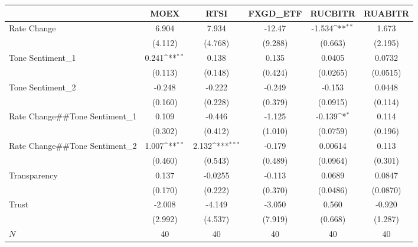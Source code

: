 {
\def\sym#1{\ifmmode^{#1}\else\(^{#1}\)\fi}
\begin{tabular}{l*{5}{c}}
\hline\hline
            &\multicolumn{1}{c}{MOEX}&\multicolumn{1}{c}{RTSI}&\multicolumn{1}{c}{FXGD\_ETF}&\multicolumn{1}{c}{RUCBITR}&\multicolumn{1}{c}{RUABITR}\\
\hline
Rate Change &       6.904         &       7.934         &      -12.47         &      -1.534\sym{**} &       1.673         \\
            &     (4.112)         &     (4.768)         &     (9.288)         &     (0.663)         &     (2.195)         \\
[1em]
Tone Sentiment\_{1}&       0.241\sym{**} &       0.138         &       0.135         &      0.0405         &      0.0732         \\
            &     (0.113)         &     (0.148)         &     (0.424)         &    (0.0265)         &    (0.0515)         \\
[1em]
Tone Sentiment\_{2}&      -0.248         &      -0.222         &      -0.249         &      -0.153         &      0.0448         \\
            &     (0.160)         &     (0.228)         &     (0.379)         &    (0.0915)         &     (0.114)         \\
[1em]
Rate Change##Tone Sentiment\_{1}&       0.109         &      -0.446         &      -1.125         &      -0.139\sym{*}  &       0.114         \\
            &     (0.302)         &     (0.412)         &     (1.010)         &    (0.0759)         &     (0.196)         \\
[1em]
Rate Change##Tone Sentiment\_{2}&       1.007\sym{**} &       2.132\sym{***}&      -0.179         &     0.00614         &       0.113         \\
            &     (0.460)         &     (0.543)         &     (0.489)         &    (0.0964)         &     (0.301)         \\
[1em]
Transparency&       0.137         &     -0.0255         &      -0.113         &      0.0689         &      0.0847         \\
            &     (0.170)         &     (0.222)         &     (0.370)         &    (0.0486)         &    (0.0870)         \\
[1em]
Trust       &      -2.008         &      -4.149         &      -3.050         &       0.560         &      -0.920         \\
            &     (2.992)         &     (4.537)         &     (7.919)         &     (0.668)         &     (1.287)         \\
\hline
\(N\)       &          40         &          40         &          40         &          40         &          40         \\
\hline\hline
\end{tabular}
}
